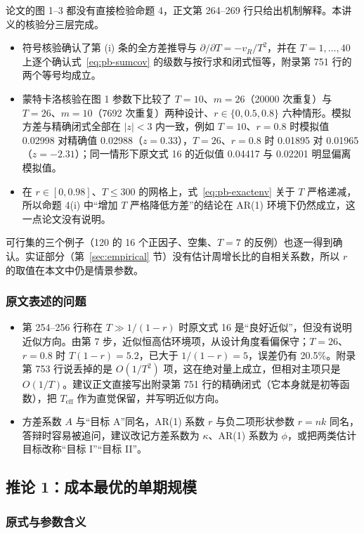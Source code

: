 论文的图 1–3 都没有直接检验命题 4，正文第 264–269 行只给出机制解释。本讲义的核验分三层完成。
\begin{itemize}
\item 符号核验确认了第 (i) 条的全方差推导与 $\partial/\partial T=-v_R/T^2$，并在 $T=1,\dots,40$ 上逐个确认式~\eqref{eq:pb-sumcov} 的级数与按行求和闭式恒等，附录第 751 行的两个等号均成立。
\item 蒙特卡洛核验在图 1 参数下比较了 $T=10$、$m=26$（20000 次重复）与 $T=26$、$m=10$（7692 次重复）两种设计、$r\in\{0,0.5,0.8\}$ 六种情形。模拟方差与精确闭式全部在 $|z|<3$ 内一致，例如 $T=10$、$r=0.8$ 时模拟值 0.02998 对精确值 0.02988（$z=0.33$），$T=26$、$r=0.8$ 时 0.01895 对 0.01965（$z=-2.31$）；同一情形下原文式 16 的近似值 0.04417 与 0.02201 明显偏离模拟值。
\item 在 $r\in[0,0.98]$、$T\le300$ 的网格上，式~\eqref{eq:pb-exactenv} 关于 $T$ 严格递减，所以命题 4(i) 中“增加 $T$ 严格降低方差”的结论在 AR(1) 环境下仍然成立，这一点论文没有说明。
\end{itemize}
可行集的三个例子（120 的 16 个正因子、空集、$T=7$ 的反例）也逐一得到确认。实证部分（第~\ref{sec:empirical} 节）没有估计周增长比的自相关系数，所以 $r$ 的取值在本文中仍是情景参数。

\subsubsection{原文表述的问题}

\begin{itemize}
\item 第 254–256 行称在 $T\gg1/(1-r)$ 时原文式 16 是“良好近似”，但没有说明近似方向。由第 7 步，近似恒高估环境项，从设计角度看偏保守；$T=26$、$r=0.8$ 时 $T(1-r)=5.2$，已大于 $1/(1-r)=5$，误差仍有 20.5\%。附录第 753 行说丢掉的是 $O(1/T^2)$ 项，这在绝对量上成立，但相对主项只是 $O(1/T)$。建议正文直接写出附录第 751 行的精确闭式（它本身就是初等函数），把 $T_{\operatorname{eff}}$ 作为直觉保留，并写明近似方向。
\item 方差系数 $A$ 与“目标 A”同名，AR(1) 系数 $r$ 与负二项形状参数 $r=nk$ 同名，答辩时容易被追问，建议改记方差系数为 $\kappa$、AR(1) 系数为 $\phi$，或把两类估计目标改称“目标 I”“目标 II”。
\end{itemize}

\subsection{推论 1：成本最优的单期规模}

\subsubsection{原式与参数含义}

